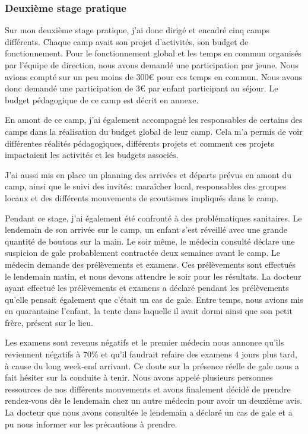 \documentclass[titlepage,11pt,a4paper]{article}
\begin{document}
\subsubsection{Deuxième stage pratique}


Sur mon deuxième stage pratique, j'ai donc dirigé et encadré cinq camps différents. Chaque camp avait son
projet d'activités, son budget de fonctionnement. Pour le fonctionnement global et les
temps en commun organisés par l'équipe de direction, nous avons demandé une participation
par jeune. Nous avions compté sur un peu moins de 300€ pour ces temps en commun. Nous
avons donc demandé une participation de 3€ par enfant participant au séjour. Le budget
pédagogique de ce camp est décrit en annexe.

En amont de ce camp, j'ai également accompagné les responsables de certains des camps dans
la réalisation du budget global de leur camp. Cela m'a permis de voir différentes
réalités pédagogiques, différents projets et comment ces projets impactaient les activités
et les budgets associés.

J'ai aussi mis en place un planning des arrivées et départs prévus en amont du camp, ainsi
que le suivi des invités: maraîcher local, responsables des groupes locaux et des
différents mouvements de scoutismes impliqués dans le camp.

Pendant ce stage, j'ai également été confronté à des problématiques
sanitaires. Le lendemain de son arrivée sur le camp, un enfant s'est réveillé avec une
grande quantité de boutons sur la main. Le soir même, le médecin consulté déclare une
suspicion de gale probablement contractée deux semaines avant le camp. Le médecin demande
des prélèvements et examens. Ces prélèvements sont effectués
le lendemain matin, et nous devons attendre le soir pour les résultats. La docteur ayant
effectué les prélèvements et examens a déclaré pendant les prélèvements qu'elle pensait
également que c'était un cas de gale. Entre temps, nous avions mis en quarantaine
l'enfant, la tente dans laquelle il avait dormi ainsi que son petit frère, présent sur le
lieu.

Les examens sont revenus négatifs et le premier médecin nous annonce qu'ils reviennent
négatifs à 70\% et qu'il faudrait refaire des examens 4 jours plus tard, à cause du long
week-end arrivant. Ce doute sur la présence réelle de gale nous a fait hésiter sur la
conduite à tenir. Nous avons appelé plusieurs personnes ressources de nos différents
mouvements et avons finalement décidé de prendre rendez-vous dès le lendemain chez un
autre médecin pour avoir un deuxième avis. La docteur que nous avons consultée le
lendemain a déclaré un cas de gale et a pu nous informer sur les précautions à prendre.
\end{document}
